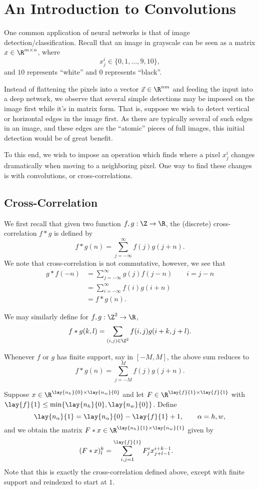 

\section{An Introduction to Convolutions}

One common application of neural networks is that of image detection/classification.  Recall that an image in grayscale can be seen as a matrix $x\in\R^{m\times n}$, where
$$x^i_j\in\{0,1,...,9,10\},$$
and $10$ represents ``white'' and $0$ represents ``black''.

Instead of flattening the pixels into a vector $\vec{x}\in\R^{nm}$ and feeding the input into a deep network, we observe that several simple detections may be imposed on the image first while it's in matrix form.  That is, suppose we wish to detect vertical or horizontal edges in the image first.  As there are typically several of such edges in an image, and these edges are the ``atomic'' pieces of full images, this initial detection would be of great benefit.

To this end, we wish to impose an operation which finds where a pixel $x^i_j$ changes dramatically when moving to a neighboring pixel.  One way to find these changes is with convolutions, or cross-correlations.


\subsection{Cross-Correlation}

We first recall that given two function $f,g:\Z\to\R$, the (discrete) cross-correlation $f*g$ is defined by
$$f*g(n)=\sum_{j=-\infty}^\infty f(j)g(j+n).$$
We note that cross-correlation is not commutative, however, we see that
\begin{align*}
	g*f(-n)&=\sum_{j=-\infty}^\infty g(j)f(j-n)\qquad i=j-n\\
	&=\sum_{i=-\infty}^\infty f(i)g(i+n)\\
	&=f*g(n).
\end{align*}

We may similarly define for $f,g:\Z^2\to\R$,
$$f*g(k,l)=\sum_{(i,j)\in\Z^2}f(i,j)g(i+k,j+l).$$



Whenever $f$ or $g$ has finite support, say in $[-M,M]$, the above sum reduces to
$$f*g(n)=\sum_{j=-M}^Mf(j)g(j+n).$$


Suppose $x\in\R^{\lay{n_h}{0}\times \lay{n_w}{0}}$ and let $F\in\R^{\lay{f}{1}\times\lay{f}{1}}$ with $\lay{f}{1}\leq\min\{\lay{n_h}{0},\lay{n_w}{0}\}$.  Define
$$\lay{n_\alpha}{1}=\lay{n_\alpha}{0}-\lay{f}{1}+1,\qquad \alpha=h,w,$$
and we obtain the matrix $F*x\in\R^{\lay{n_h}{1}\times\lay{n_w}{1}}$ given by
\begin{align*}
	(F*x)^k_l&=\sum_{i,j=1}^{\lay{f}{1}}F^i_jx^{i+k-1}_{j+l-1}.
\end{align*}
Note that this is exactly the cross-correlation defined above, except with finite support and reindexed to start at $1$.

